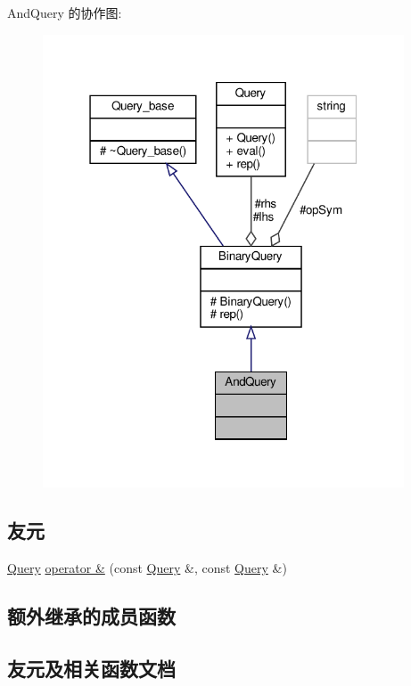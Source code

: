 And\+Query 的协作图\+:\nopagebreak
\begin{figure}[H]
\begin{center}
\leavevmode
\includegraphics[width=304pt]{classAndQuery__coll__graph}
\end{center}
\end{figure}
\subsection*{友元}
\begin{DoxyCompactItemize}
\item 
\hyperlink{classQuery}{Query} \hyperlink{classAndQuery_a9669c004503314734a5671692f392812}{operator \&} (const \hyperlink{classQuery}{Query} \&, const \hyperlink{classQuery}{Query} \&)
\end{DoxyCompactItemize}
\subsection*{额外继承的成员函数}


\subsection{友元及相关函数文档}
\mbox{\label{classAndQuery_a9669c004503314734a5671692f392812}} 
